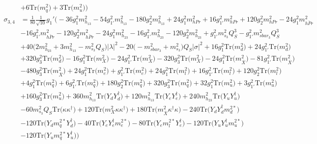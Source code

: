 \begin{align}
 &+6 \mbox{Tr}\Big({m_q^2}\Big) +3 \mbox{Tr}\Big({m_u^2}\Big) \Big)\\ 
\sigma_{3,4} & = \frac{1}{80} \frac{1}{\sqrt{10}} g_1' \Big(-36 g_{1}^{2} m_{h_{13}}^2 -54 g_{1'}^{2} m_{h_{13}}^2 -180 g_{2}^{2} m_{h_{13}}^2 +24 g_{1}^{2} m_{hPr}^2 +16 g_{1'}^{2} m_{hPr}^2 +120 g_{2}^{2} m_{hPr}^2 -24 g_{1}^{2} m_{\bar{hPr}}^2 \nonumber \\ 
 &-16 g_{1'}^{2} m_{\bar{hPr}}^2 -120 g_{2}^{2} m_{\bar{hPr}}^2 -24 g_{1}^{2} m_{h_{23}}^2 -16 g_{1'}^{2} m_{h_{23}}^2 -120 g_{2}^{2} m_{h_{23}}^2 +g_{1'}^{2} m_{s_3}^2 Q_{S}^{3} - g_{1'}^{2} m_{sbar_3}^2 Q_{S}^{3} \nonumber \\ 
 &+40 \Big(2 m_{h_{23}}^2  + 3 m_{h_{13}}^2  - m_{s_3}^2 Q_{S} \Big)|\lambda|^2 -20 \Big(- m_{sbar_3}^2  + m_{s_3}^2\Big)Q_{S} |\sigma|^2 +16 g_{1}^{2} \mbox{Tr}\Big({m_d^2}\Big) +24 g_{1'}^{2} \mbox{Tr}\Big({m_d^2}\Big) \nonumber \\ 
 &+320 g_{3}^{2} \mbox{Tr}\Big({m_d^2}\Big) -16 g_{1}^{2} \mbox{Tr}\Big({m_{X}^2}\Big) -24 g_{1'}^{2} \mbox{Tr}\Big({m_{X}^2}\Big) -320 g_{3}^{2} \mbox{Tr}\Big({m_{X}^2}\Big) -24 g_{1}^{2} \mbox{Tr}\Big({m_{\bar{X}}^2}\Big) -81 g_{1'}^{2} \mbox{Tr}\Big({m_{\bar{X}}^2}\Big) \nonumber \\ 
 &-480 g_{3}^{2} \mbox{Tr}\Big({m_{\bar{X}}^2}\Big) +24 g_{1}^{2} \mbox{Tr}\Big({m_e^2}\Big) +g_{1'}^{2} \mbox{Tr}\Big({m_e^2}\Big) +24 g_{1}^{2} \mbox{Tr}\Big({m_l^2}\Big) +16 g_{1'}^{2} \mbox{Tr}\Big({m_l^2}\Big) +120 g_{2}^{2} \mbox{Tr}\Big({m_l^2}\Big) \nonumber \\ 
 &+4 g_{1}^{2} \mbox{Tr}\Big({m_q^2}\Big) +6 g_{1'}^{2} \mbox{Tr}\Big({m_q^2}\Big) +180 g_{2}^{2} \mbox{Tr}\Big({m_q^2}\Big) +320 g_{3}^{2} \mbox{Tr}\Big({m_q^2}\Big) +32 g_{1}^{2} \mbox{Tr}\Big({m_u^2}\Big) +3 g_{1'}^{2} \mbox{Tr}\Big({m_u^2}\Big) \nonumber \\ 
 &+160 g_{3}^{2} \mbox{Tr}\Big({m_u^2}\Big) +360 m_{h_{13}}^2 \mbox{Tr}\Big({Y_d  Y_{d}^{\dagger}}\Big) +120 m_{h_{13}}^2 \mbox{Tr}\Big({Y_e  Y_{e}^{\dagger}}\Big) +240 m_{h_{23}}^2 \mbox{Tr}\Big({Y_u  Y_{u}^{\dagger}}\Big) \nonumber \\ 
 &-60 m_{s_3}^2 Q_{S} \mbox{Tr}\Big({\kappa  \kappa^{\dagger}}\Big) +120 \mbox{Tr}\Big({m_{X}^2  \kappa  \kappa^{\dagger}}\Big) +180 \mbox{Tr}\Big({m_{\bar{X}}^2  \kappa^{\dagger}  \kappa}\Big) -240 \mbox{Tr}\Big({Y_d  Y_{d}^{\dagger}  m_d^{2 *}}\Big) \nonumber \\ 
 &-120 \mbox{Tr}\Big({Y_d  m_q^{2 *}  Y_{d}^{\dagger}}\Big) -40 \mbox{Tr}\Big({Y_e  Y_{e}^{\dagger}  m_e^{2 *}}\Big) -80 \mbox{Tr}\Big({Y_e  m_l^{2 *}  Y_{e}^{\dagger}}\Big) -120 \mbox{Tr}\Big({Y_u  Y_{u}^{\dagger}  m_u^{2 *}}\Big) \nonumber \\ 
 &-120 \mbox{Tr}\Big({Y_u  m_q^{2 *}  Y_{u}^{\dagger}}\Big) \Big)
\end{align} 
